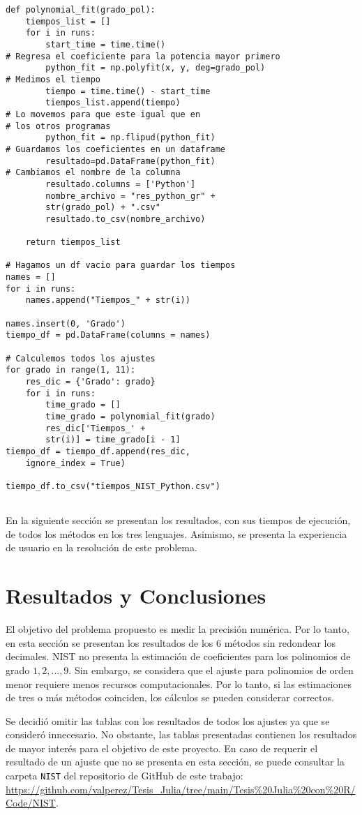 \begin{verbatim}
def polynomial_fit(grado_pol):
	tiempos_list = []
	for i in runs:
		start_time = time.time()
# Regresa el coeficiente para la potencia mayor primero
		python_fit = np.polyfit(x, y, deg=grado_pol)
# Medimos el tiempo
		tiempo = time.time() - start_time
		tiempos_list.append(tiempo)
# Lo movemos para que este igual que en 
# los otros programas
		python_fit = np.flipud(python_fit)
# Guardamos los coeficientes en un dataframe
		resultado=pd.DataFrame(python_fit)
# Cambiamos el nombre de la columna
		resultado.columns = ['Python']
		nombre_archivo = "res_python_gr" + 
		str(grado_pol) + ".csv"
		resultado.to_csv(nombre_archivo)

	return tiempos_list

# Hagamos un df vacio para guardar los tiempos
names = []
for i in runs:
	names.append("Tiempos_" + str(i))

names.insert(0, 'Grado')
tiempo_df = pd.DataFrame(columns = names)

# Calculemos todos los ajustes
for grado in range(1, 11):
	res_dic = {'Grado': grado}
	for i in runs:
		time_grado = []
		time_grado = polynomial_fit(grado)
		res_dic['Tiempos_' + 
		str(i)] = time_grado[i - 1]
tiempo_df = tiempo_df.append(res_dic, 
	ignore_index = True)

tiempo_df.to_csv("tiempos_NIST_Python.csv")
	
\end{verbatim}

En la siguiente sección se presentan los resultados, con sus tiempos de ejecución, de todos los métodos en los tres lenguajes. Asimismo, se presenta la experiencia de usuario en la resolución de este problema. 

\section{Resultados y Conclusiones} \label{sec_evalMetodos}

El objetivo del problema propuesto es medir la precisión numérica. Por lo tanto, en esta sección se presentan los resultados de los 6 métodos sin redondear los decimales. NIST no presenta la estimación de coeficientes para los polinomios de grado $1, 2, \dots, 9$. Sin embargo, se considera que el ajuste para polinomios de orden menor requiere menos recursos computacionales. Por lo tanto, si las estimaciones de tres o más métodos coinciden, los cálculos se pueden considerar correctos. 

Se decidió omitir las tablas con los resultados de todos los ajustes ya que se consideró innecesario. No obstante, las tablas presentadas contienen los resultados de mayor interés para el objetivo de este proyecto. En caso de requerir el resultado de un ajuste que no se presenta en esta sección, se puede consultar la carpeta \texttt{NIST} del repositorio de GitHub de este trabajo: \url{https://github.com/valperez/Tesis_Julia/tree/main/Tesis%20Julia%20con%20R/Code/NIST}. 

